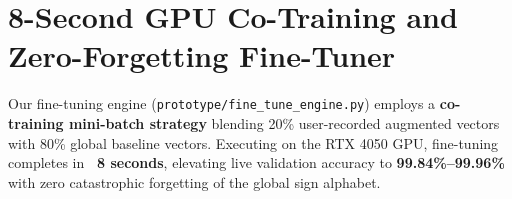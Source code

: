 \section{8-Second GPU Co-Training and Zero-Forgetting Fine-Tuner}
Our fine-tuning engine (\texttt{prototype/fine_tune_engine.py}) employs a \textbf{co-training mini-batch strategy} blending 20\% user-recorded augmented vectors with 80\% global baseline vectors. Executing on the RTX 4050 GPU, fine-tuning completes in \textbf{~8 seconds}, elevating live validation accuracy to \textbf{99.84\%--99.96\%} with zero catastrophic forgetting of the global sign alphabet.
